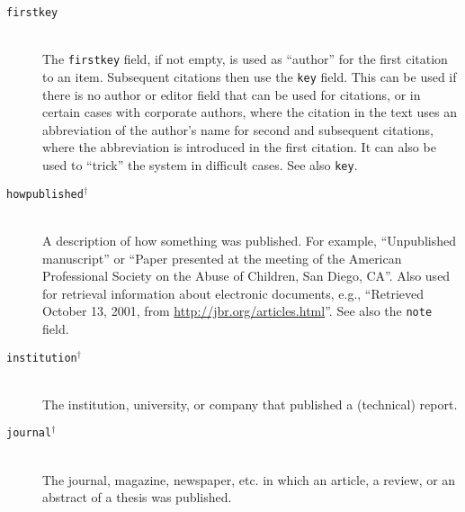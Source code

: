 \documentclass{article}
\newcommand{\bibnodot}[1]{}
\newcommand{\LC}{\mbox{${}^{\dag}$}}%
\newcommand{\fieldname}[1]{\texttt{#1}}%
\begin{document}
\begin{description}
    \item[\fieldname{firstkey}] \mbox{}\\
       The \fieldname{firstkey} field, if not empty, is used as
       ``author'' for the first citation to an item. Subsequent citations
       then use the \fieldname{key} field. This can be used if there is
       no author or editor field that can be used for citations, or in
       certain cases with corporate authors, where the citation in the
       text uses an abbreviation of the author's name for second and
       subsequent citations, where the abbreviation is introduced in the
       first citation. It can also be used to ``trick'' the system
       in difficult cases. See also \fieldname{key}.

    \item[\fieldname{howpublished}\LC] \mbox{}\\
       A description of how something was published. For example,
       ``Unpublished manuscript'' or ``Paper presented at the meeting
       of the American Professional Society on the Abuse of Children,
       San Diego, CA''. Also used for retrieval information about
       electronic documents, e.g., ``Retrieved October 13, 2001, from
       \url{http://jbr.org/articles.html}\bibnodot{.}''. See also
       the \fieldname{note} field.

    \item[\fieldname{institution}\LC] \mbox{}\\
       The institution, university, or company that published a
       (technical) report.

    \item[\fieldname{journal}\LC] \mbox{}\\
       The journal, magazine, newspaper, etc.{} in which an
       article, a review, or an abstract of a thesis was published.


\end{description}
\end{document}
